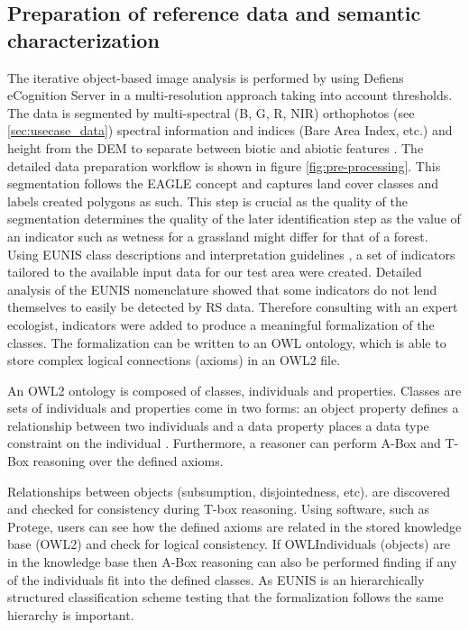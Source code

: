 \documentclass[authoryear, review,12pt,number]{elsarticle}
\begin{document}
\label{subsec:Preparation_of_reference_data_and_semantic_characterisation} 
\subsection{Preparation of reference data and semantic characterization} The
iterative object-based image analysis is performed by \cite{Tintrup2015} using
Defiens eCognition Server in a multi-resolution approach
\citep{baatz2001ecognition} taking into account thresholds. The data is
segmented by multi-spectral (B, G, R, NIR) orthophotos (see
\ref{sec:usecase_data}) spectral information and indices (Bare Area Index, etc.)
and height from the DEM to separate between biotic and abiotic features
\citep{Tintrup2015}. The detailed data preparation workflow is shown in figure
\ref{fig:pre-processing}. This segmentation follows the EAGLE concept and
captures land cover classes and labels created polygons as such. This step is
crucial as the quality of the segmentation determines the quality of the later
identification step as the value of an indicator such as wetness for a grassland
might differ for that of a forest. Using EUNIS class descriptions and
interpretation guidelines \citep{EUNISManual}, a set of indicators tailored to
the available input data for our test area were created. Detailed analysis of
the EUNIS nomenclature showed that some indicators do not lend themselves to
easily be detected by RS data. Therefore consulting with an expert ecologist,
indicators were added to produce a meaningful formalization of the classes. The
formalization can be written to an OWL ontology, which is able to store complex
logical connections (axioms) in an OWL2 file.

An OWL2 ontology is composed of classes, individuals and properties. Classes are
sets of individuals and properties come in two forms: an object property defines
a relationship between two individuals and a data property  places a data type
constraint on the individual \citep{OWL2}. Furthermore, a reasoner can perform
A-Box and T-Box reasoning over the defined axioms. 

Relationships between objects (subsumption, disjointedness, etc). are discovered
and checked for consistency during T-box reasoning. Using software, such as
Protege, users can see how the defined axioms are related in the stored
knowledge base (OWL2) and check for logical consistency. If OWLIndividuals
(objects) are in the knowledge base then A-Box reasoning can also be performed
finding if any of the individuals fit into the defined classes. As EUNIS is an
hierarchically structured classification scheme testing that the formalization
follows the same hierarchy is important. 
\end{document}
